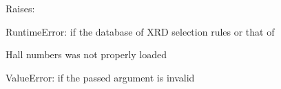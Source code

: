 \documentclass[letterpaper,10pt,english]{sphinxmanual}
\begin{document}
\begin{fulllineitems}
\begin{DUlineblock}{0em}
\item[] Raises:
\item[]
\begin{DUlineblock}{\DUlineblockindent}
\item[] RuntimeError: if the database of XRD selection rules or that of
\item[]
\begin{DUlineblock}{\DUlineblockindent}
\item[] Hall numbers was not properly loaded
\end{DUlineblock}
\item[] ValueError: if the passed argument is invalid
\end{DUlineblock}
\end{DUlineblock}

\end{fulllineitems}

\end{document}
